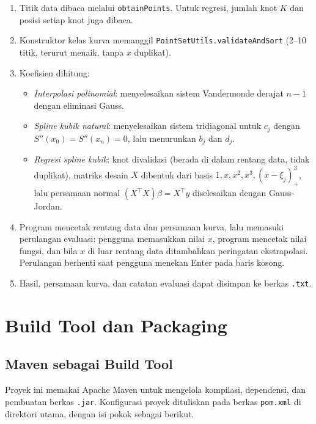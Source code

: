 \documentclass[12pt,a4paper]{report}
\begin{document}
\begin{enumerate}
  \item Titik data dibaca melalui \texttt{obtainPoints}. Untuk regresi, jumlah
    knot $K$ dan posisi setiap knot juga dibaca.
  \item Konstruktor kelas kurva memanggil \texttt{PointSetUtils.validateAndSort}
    (2--10 titik, terurut menaik, tanpa $x$ duplikat).
  \item Koefisien dihitung:
    \begin{itemize}
      \item \textit{Interpolasi polinomial}: menyelesaikan sistem Vandermonde
        derajat $n-1$ dengan eliminasi Gauss.
      \item \textit{Spline kubik natural}: menyelesaikan sistem tridiagonal
        untuk $c_j$ dengan $S''(x_0) = S''(x_n) = 0$, lalu menurunkan $b_j$
        dan $d_j$.
      \item \textit{Regresi spline kubik}: knot divalidasi (berada di dalam
        rentang data, tidak duplikat), matriks desain $X$ dibentuk dari basis
        $1, x, x^2, x^3, (x-\xi_j)_+^3$, lalu persamaan normal
        $(X^{\top}X)\beta = X^{\top}y$ diselesaikan dengan Gauss-Jordan.
    \end{itemize}
  \item Program mencetak rentang data dan persamaan kurva, lalu memasuki
    perulangan evaluasi: pengguna memasukkan nilai $x$, program mencetak
    nilai fungsi, dan bila $x$ di luar rentang data ditambahkan peringatan
    ekstrapolasi. Perulangan berhenti saat pengguna menekan Enter pada baris
    kosong.
  \item Hasil, persamaan kurva, dan catatan evaluasi dapat disimpan ke
    berkas \texttt{.txt}.
\end{enumerate}


\section{Build Tool dan Packaging}


\subsection{Maven sebagai Build Tool}

Proyek ini memakai Apache Maven untuk mengelola kompilasi, dependensi, dan
pembuatan berkas \texttt{.jar}. Konfigurasi proyek dituliskan pada berkas
\texttt{pom.xml} di direktori utama, dengan isi pokok sebagai berikut.
\end{document}
